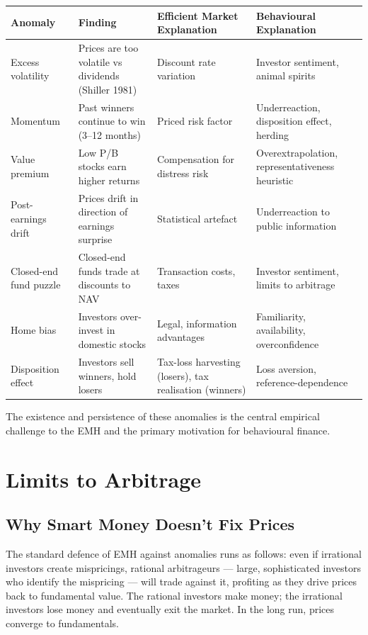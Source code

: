 \documentclass[12pt, letterpaper]{article}
\begin{document}
\begin{table}[H]
\centering
\small
\begin{tabularx}{\linewidth}{lYYY}
\toprule
Anomaly & Finding & Efficient Market Explanation & Behavioural Explanation \\
\midrule
Excess volatility & Prices are too volatile vs dividends (Shiller 1981) & Discount rate variation & Investor sentiment, animal spirits \\
Momentum & Past winners continue to win (3--12 months) & Priced risk factor & Underreaction, disposition effect, herding \\
Value premium & Low P/B stocks earn higher returns & Compensation for distress risk & Overextrapolation, representativeness heuristic \\
Post-earnings drift & Prices drift in direction of earnings surprise & Statistical artefact & Underreaction to public information \\
Closed-end fund puzzle & Closed-end funds trade at discounts to NAV & Transaction costs, taxes & Investor sentiment, limits to arbitrage \\
Home bias & Investors over-invest in domestic stocks & Legal, information advantages & Familiarity, availability, overconfidence \\
Disposition effect & Investors sell winners, hold losers & Tax-loss harvesting (losers), tax realisation (winners) & Loss aversion, reference-dependence \\
\bottomrule
\end{tabularx}
\end{table}


The existence and persistence of these anomalies is the central empirical challenge to the EMH and the primary motivation for behavioural finance.

\medskip


\section{Limits to Arbitrage}



\subsection{Why Smart Money Doesn't Fix Prices}


The standard defence of EMH against anomalies runs as follows: even if irrational investors create mispricings, rational arbitrageurs --- large, sophisticated investors who identify the mispricing --- will trade against it, profiting as they drive prices back to fundamental value. The rational investors make money; the irrational investors lose money and eventually exit the market. In the long run, prices converge to fundamentals.
\end{document}
